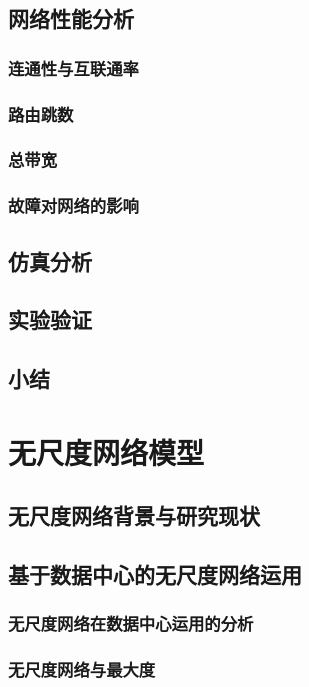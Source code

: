 \documentclass[master]{njuthesis}
\begin{document}
\section{网络性能分析}
\blindtext
\subsection{连通性与互联通率}
\Blindtext
\subsection{路由跳数}
\Blindtext
\subsection{总带宽}
\Blindtext
\subsection{故障对网络的影响}
\Blindtext
\section{仿真分析}
\Blindtext
\section{实验验证}
\Blindtext
\section{小结}
\blindtext

\chapter{无尺度网络模型}\label{chapter_scalefree}
\section{无尺度网络背景与研究现状}
\Blindtext
\section{基于数据中心的无尺度网络运用}
\subsection{无尺度网络在数据中心运用的分析}
\Blindtext
\subsection{无尺度网络与最大度}
\Blindtext
\end{document}
